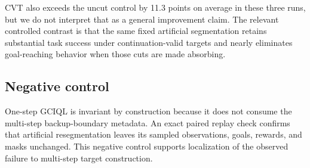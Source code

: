 CVT also exceeds the uncut control by 11.3 points on average in these three runs, but we do not interpret that as a general improvement claim. The relevant controlled contrast is that the same fixed artificial segmentation retains substantial task success under continuation-valid targets and nearly eliminates goal-reaching behavior when those cuts are made absorbing.

\subsection{Negative control}

One-step GCIQL is invariant by construction because it does not consume the multi-step backup-boundary metadata. An exact paired replay check confirms that artificial resegmentation leaves its sampled observations, goals, rewards, and masks unchanged. This negative control supports localization of the observed failure to multi-step target construction.
